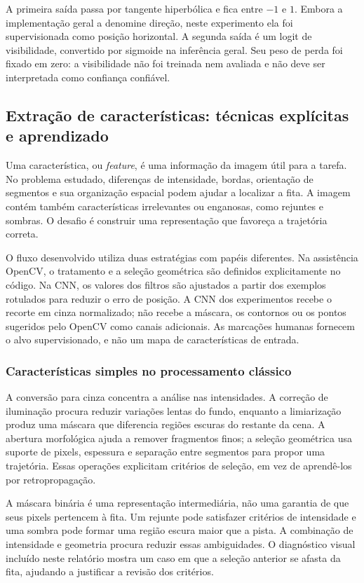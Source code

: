 \documentclass[a4paper,oneside,11pt]{article}
\begin{document}
A primeira saída passa por tangente hiperbólica e fica entre $-1$ e $1$. Embora a implementação geral a denomine direção, neste experimento ela foi supervisionada como posição horizontal. A segunda saída é um logit de visibilidade, convertido por sigmoide na inferência geral. Seu peso de perda foi fixado em zero: a visibilidade não foi treinada nem avaliada e não deve ser interpretada como confiança confiável.


\subsection{Extração de características: técnicas explícitas e aprendizado}
Uma característica, ou \textit{feature}, é uma informação da imagem útil para a tarefa. No problema estudado, diferenças de intensidade, bordas, orientação de segmentos e sua organização espacial podem ajudar a localizar a fita. A imagem contém também características irrelevantes ou enganosas, como rejuntes e sombras. O desafio é construir uma representação que favoreça a trajetória correta.

O fluxo desenvolvido utiliza duas estratégias com papéis diferentes. Na assistência OpenCV, o tratamento e a seleção geométrica são definidos explicitamente no código. Na CNN, os valores dos filtros são ajustados a partir dos exemplos rotulados para reduzir o erro de posição. A CNN dos experimentos recebe o recorte em cinza normalizado; não recebe a máscara, os contornos ou os pontos sugeridos pelo OpenCV como canais adicionais. As marcações humanas fornecem o alvo supervisionado, e não um mapa de características de entrada.

\subsubsection{Características simples no processamento clássico}
A conversão para cinza concentra a análise nas intensidades. A correção de iluminação procura reduzir variações lentas do fundo, enquanto a limiarização produz uma máscara que diferencia regiões escuras do restante da cena. A abertura morfológica ajuda a remover fragmentos finos; a seleção geométrica usa suporte de pixels, espessura e separação entre segmentos para propor uma trajetória. Essas operações explicitam critérios de seleção, em vez de aprendê-los por retropropagação.

A máscara binária é uma representação intermediária, não uma garantia de que seus pixels pertencem à fita. Um rejunte pode satisfazer critérios de intensidade e uma sombra pode formar uma região escura maior que a pista. A combinação de intensidade e geometria procura reduzir essas ambiguidades. O diagnóstico visual incluído neste relatório mostra um caso em que a seleção anterior se afasta da fita, ajudando a justificar a revisão dos critérios.
\end{document}
